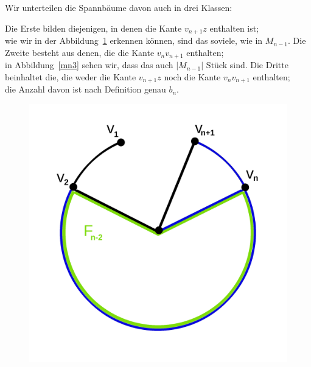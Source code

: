 Wir unterteilen die Spannbäume davon auch in drei Klassen:\\
\par
\begingroup
\leftskip=20pt
\rightskip=20pt
\noindent
Die Erste bilden diejenigen, in denen die Kante $v_{n+1}z$ enthalten ist;\\
wie wir in der Abbildung~\ref{mn2} erkennen können, sind das soviele, wie in $M_{n-1}$.
\vfill
Die Zweite besteht aus denen, die die Kante $v_nv_{n+1}$ enthalten;\\
in Abbildung~\ref{mn3} sehen wir, dass das auch $|M_{n-1}|$ Stück sind.
\vfill
Die Dritte beinhaltet die, die weder die Kante $v_{n+1}z$ noch die Kante $v_nv_{n+1}$ enthalten;\\ die Anzahl davon ist nach Definition genau $b_{n}$.
\paragraphmark
\endgroup
\begin{figure}[H]
    \centering
    \begin{minipage}{0.45\textwidth}
        \centering
        \includegraphics[width=1\textwidth]{mn2.png}
        \caption{}
 \label{mn2} %
    \end{minipage}\hfill
    \begin{minipage}{0.45\textwidth}
        \centering

\end{minipage}
\end{figure}
